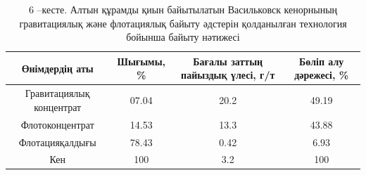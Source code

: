 \begin{table}[H]
\caption*{6 --кесте. Алтын құрамды қиын байытылатын Васильковск кенорнының
гравитациялық және флотациялық байыту әдстерін қолданылған технология
бойынша байыту нәтижесі}
\centering
\begin{tabular}{|c|c|c|c|}
\hline
Өнімдердің аты & Шығымы, \% & \multicolumn{1}{p{0.2\textwidth}|}{Бағалы заттың пайыздық үлесі, г/т} & Бөліп алу дәрежесі, \% \\ \hline
Гравитациялық концентрат & \multicolumn{1}{c|}{07.04} & 20.2                      & 49.19                    \\ \hline
Флотоконцентрат          & 14.53                      & 13.3                      & 43.88                    \\ \hline
Флотацияқалдығы          & 78.43                      & \multicolumn{1}{c|}{0.42} & 6.93                     \\ \hline
Кен                      & \multicolumn{1}{c|}{100}   & 3.2                       & \multicolumn{1}{c|}{100} \\ \hline
\end{tabular}
\end{table}


